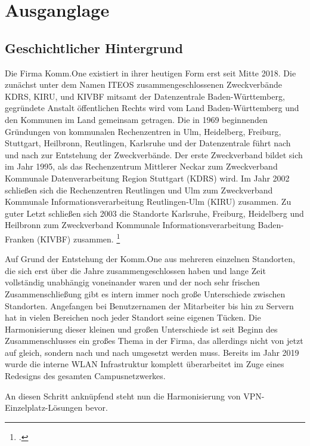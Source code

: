 \chapter{Ausganglage} %
\label{cha:Ausganglage}

\section{Geschichtlicher Hintergrund} %
\label{sec:Geschichtlicher Hintergrund}

Die Firma Komm.One existiert in ihrer heutigen Form erst seit Mitte 2018. Die zunächst unter dem Namen ITEOS zusammengeschlossenen Zweckverbände KDRS, KIRU, und KIVBF mitsamt der Datenzentrale Baden-Württemberg, gegründete Anstalt öffentlichen Rechts wird vom Land Baden-Württemberg und den Kommunen im Land gemeinsam getragen. Die in 1969 beginnenden Gründungen von kommunalen Rechenzentren in Ulm, Heidelberg, Freiburg, Stuttgart, Heilbronn, Reutlingen, Karlsruhe und der Datenzentrale führt nach und nach zur Entstehung der Zweckverbände. Der erste Zweckverband bildet sich im Jahr 1995, als das Rechenzentrum Mittlerer Neckar zum Zweckverband Kommunale Datenverarbeitung Region Stuttgart (KDRS) wird. Im Jahr 2002 schließen sich die Rechenzentren Reutlingen und Ulm zum Zweckverband Kommunale Informationsverarbeitung Reutlingen-Ulm (KIRU) zusammen. Zu guter Letzt schließen sich 2003 die Standorte Karlsruhe, Freiburg, Heidelberg und Heilbronn zum Zweckverband Kommunale Informationsverarbeitung Baden-Franken (KIVBF) zusammen. \footcite[Vgl.][auch im Folgenden]{o.V..2022}

Auf Grund der Entstehung der Komm.One aus mehreren einzelnen Standorten, die sich erst über die Jahre zusammengeschlossen haben und lange Zeit vollständig unabhängig voneinander waren und der noch sehr frischen Zusammenschließung gibt es intern immer noch große Unterschiede zwischen Standorten. Angefangen bei Benutzernamen der Mitarbeiter bis hin zu Servern hat in vielen Bereichen noch jeder Standort seine eigenen Tücken. Die Harmonisierung dieser kleinen und großen Unterschiede ist seit Beginn des Zusammenschlusses ein großes Thema in der Firma, das allerdings nicht von jetzt auf gleich, sondern nach und nach umgesetzt werden muss. Bereits im Jahr 2019 wurde die interne WLAN Infrastruktur komplett überarbeitet im Zuge eines Redesigns des gesamten Campusnetzwerkes.

An diesen Schritt anknüpfend steht nun die Harmonisierung von VPN-Einzelplatz-Lösungen bevor.

